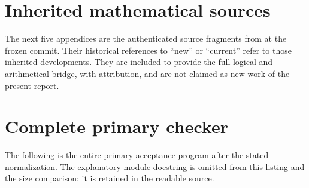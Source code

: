 \documentclass[11pt,letterpaper]{article}
\theoremstyle{definition}
\begin{document}
\appendix
\section{Inherited mathematical sources}
The next five appendices are the authenticated source fragments from
 at the frozen commit. Their
historical references to ``new'' or ``current'' refer to those inherited
developments. They are included to provide the full logical and
arithmetical bridge, with attribution, and are not claimed as new work
of the present report.


\clearpage
\section{Complete primary checker}
The following is the entire primary acceptance program after the stated
normalization. The explanatory module docstring is omitted from this
listing and the size comparison; it is retained in the readable source.
\begin{lstlisting}[language=Python]
%<CHECKER_CODE>
\end{lstlisting}
\end{document}
